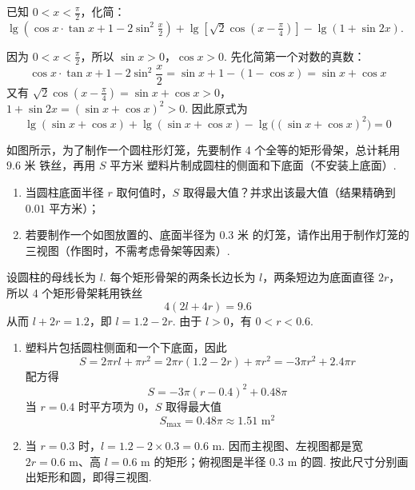 \begin{problem}
已知 \(0 < x < \frac{\pi}{2}\)，化简：\(\lg\left(\cos x \cdot \tan x + 1 - 2\sin^2\frac{x}{2}\right) + \lg\left[\sqrt{2}\cos\left(x - \frac{\pi}{4}\right)\right] - \lg(1 + \sin 2x)\).
\end{problem}

\begin{solution}
因为 \(0<x<\frac{\pi}{2}\)，所以 \(\sin x>0\)，\(\cos x>0\). 先化简第一个对数的真数：
\[
\cos x\cdot\tan x+1-2\sin^2\frac{x}{2}
=\sin x+1-(1-\cos x)=\sin x+\cos x
\]
又有
\(\sqrt{2}\cos\left(x-\frac{\pi}{4}\right)=\sin x+\cos x>0\)，\(1+\sin 2x=(\sin x+\cos x)^2>0\).
因此原式为
\[
\lg(\sin x+\cos x)+\lg(\sin x+\cos x)
-\lg\bigl((\sin x+\cos x)^2\bigr)=0
\]
\end{solution}

\begin{problem}
如图所示，为了制作一个圆柱形灯笼，先要制作 4 个全等的矩形骨架，总计耗用 \(9.6\text{ 米}\) 铁丝，再用 \(S\text{ 平方米}\) 塑料片制成圆柱的侧面和下底面（不安装上底面）.

\begin{enumerate}
\item 当圆柱底面半径 \(r\) 取何值时，\(S\) 取得最大值？并求出该最大值（结果精确到 \(0.01\text{ 平方米}\)）；
\item 若要制作一个如图放置的、底面半径为 \(0.3\text{ 米}\) 的灯笼，请作出用于制作灯笼的三视图（作图时，不需考虑骨架等因素）.
\end{enumerate}


\end{problem}

\begin{solution}
设圆柱的母线长为 \(l\). 每个矩形骨架的两条长边长为 \(l\)，两条短边为底面直径 \(2r\)，所以 4 个矩形骨架耗用铁丝
\[
4(2l+4r)=9.6
\]
从而 \(l+2r=1.2\)，即 \(l=1.2-2r\). 由于 \(l>0\)，有 \(0<r<0.6\).

\begin{enumerate}
\item 塑料片包括圆柱侧面和一个下底面，因此
\[
S=2\pi rl+\pi r^2
=2\pi r(1.2-2r)+\pi r^2
=-3\pi r^2+2.4\pi r
\]
配方得
\[
S=-3\pi(r-0.4)^2+0.48\pi
\]
当 \(r=0.4\) 时平方项为 \(0\)，\(S\) 取得最大值
\[
S_{\max}=0.48\pi\approx1.51\text{ m}^2
\]
\item 当 \(r=0.3\) 时，\(l=1.2-2\times0.3=0.6\text{ m}\). 因而主视图、左视图都是宽 \(2r=0.6\text{ m}\)、高 \(l=0.6\text{ m}\) 的矩形；俯视图是半径 \(0.3\text{ m}\) 的圆. 按此尺寸分别画出矩形和圆，即得三视图.
\end{enumerate}
\end{solution}

